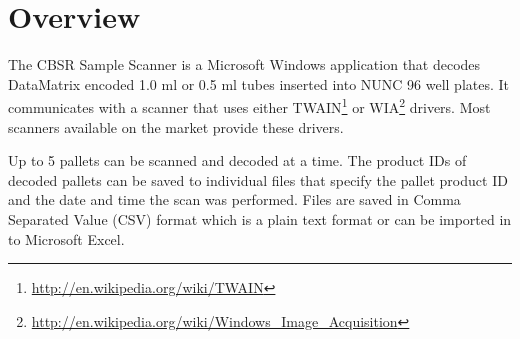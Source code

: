 \chapter{Overview}
The CBSR Sample Scanner is a Microsoft Windows application that decodes
DataMatrix encoded 1.0 ml or 0.5 ml tubes inserted into NUNC 96 well plates. It
communicates with a scanner that uses either
TWAIN\footnote{\url{http://en.wikipedia.org/wiki/TWAIN}} or
WIA\footnote{\url{http://en.wikipedia.org/wiki/Windows_Image_Acquisition}}
drivers. Most scanners available on the market provide these drivers.

Up to 5 pallets can be scanned and decoded at a time. The product IDs of
decoded pallets can be saved to individual files that specify the pallet
product ID and the date and time the scan was performed. Files are saved in
Comma Separated Value (CSV) format which is a plain text format or can be
imported in to Microsoft Excel.

